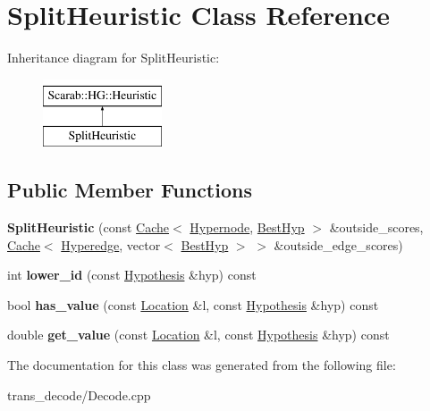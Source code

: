 \hypertarget{class_split_heuristic}{
\section{SplitHeuristic Class Reference}
\label{class_split_heuristic}
}
Inheritance diagram for SplitHeuristic:\begin{figure}[H]
\begin{center}
\leavevmode
\includegraphics[height=2cm]{class_split_heuristic}
\end{center}
\end{figure}
\subsection*{Public Member Functions}
\begin{DoxyCompactItemize}
\item 
\hypertarget{class_split_heuristic_a8f58e4a4833f73460e2b2fb9c38448f1}{
{\bfseries SplitHeuristic} (const \hyperlink{class_cache}{Cache}$<$ \hyperlink{class_scarab_1_1_h_g_1_1_hypernode}{Hypernode}, \hyperlink{class_scarab_1_1_h_g_1_1_best_hyp}{BestHyp} $>$ \&outside\_\-scores, \hyperlink{class_cache}{Cache}$<$ \hyperlink{class_scarab_1_1_h_g_1_1_hyperedge}{Hyperedge}, vector$<$ \hyperlink{class_scarab_1_1_h_g_1_1_best_hyp}{BestHyp} $>$ $>$ \&outside\_\-edge\_\-scores)}
\label{class_split_heuristic_a8f58e4a4833f73460e2b2fb9c38448f1}

\item 
\hypertarget{class_split_heuristic_a0080cc4428de2635263f31d7931c3066}{
int {\bfseries lower\_\-id} (const \hyperlink{struct_scarab_1_1_h_g_1_1_hypothesis}{Hypothesis} \&hyp) const }
\label{class_split_heuristic_a0080cc4428de2635263f31d7931c3066}

\item 
\hypertarget{class_split_heuristic_a7117c99ce380835ed38aa02f82f8a04e}{
bool {\bfseries has\_\-value} (const \hyperlink{struct_scarab_1_1_h_g_1_1_location}{Location} \&l, const \hyperlink{struct_scarab_1_1_h_g_1_1_hypothesis}{Hypothesis} \&hyp) const }
\label{class_split_heuristic_a7117c99ce380835ed38aa02f82f8a04e}

\item 
\hypertarget{class_split_heuristic_ab64ec7cde28b49828bcde1ad97862cc2}{
double {\bfseries get\_\-value} (const \hyperlink{struct_scarab_1_1_h_g_1_1_location}{Location} \&l, const \hyperlink{struct_scarab_1_1_h_g_1_1_hypothesis}{Hypothesis} \&hyp) const }
\label{class_split_heuristic_ab64ec7cde28b49828bcde1ad97862cc2}

\end{DoxyCompactItemize}


The documentation for this class was generated from the following file:\begin{DoxyCompactItemize}
\item 
trans\_\-decode/Decode.cpp\end{DoxyCompactItemize}
